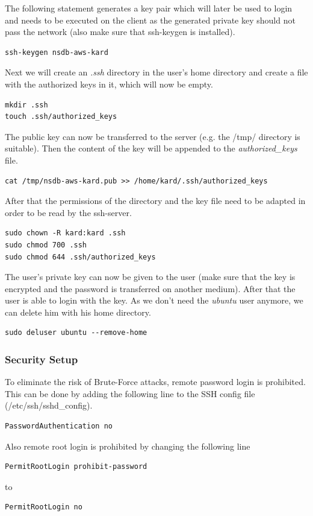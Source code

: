 The following statement generates a key pair which will later be used to login and needs to be executed on the client as the generated private key should not pass the network (also make sure that ssh-keygen is installed).
\begin{lstlisting}
ssh-keygen nsdb-aws-kard
\end{lstlisting}

Next we will create an \textit{.ssh} directory in the user's home directory and create a file with the authorized keys in it, which will now be empty.
\begin{lstlisting}
mkdir .ssh
touch .ssh/authorized_keys
\end{lstlisting}

The public key can now be transferred to the server (e.g. the /tmp/ directory is suitable). Then the content of the key will be appended to the \textit{authorized\_keys} file.
\begin{lstlisting}
cat /tmp/nsdb-aws-kard.pub >> /home/kard/.ssh/authorized_keys
\end{lstlisting}

After that the permissions of the directory and the key file need to be adapted in order to be read by the ssh-server.
\begin{lstlisting}
sudo chown -R kard:kard .ssh
sudo chmod 700 .ssh
sudo chmod 644 .ssh/authorized_keys
\end{lstlisting}

The user's private key can now be given to the user (make sure that the key is encrypted and the password is transferred on another medium). After that the user is able to login with the key. As we don't need the \textit{ubuntu} user anymore, we can delete him with his home directory.
\begin{lstlisting}
sudo deluser ubuntu --remove-home 
\end{lstlisting}

\subsubsection{Security Setup}
To eliminate the risk of Brute-Force attacks, remote password login is prohibited. This can be done by adding the following line to the SSH config file (/etc/ssh/sshd\_config).
\begin{lstlisting}
PasswordAuthentication no
\end{lstlisting}

Also remote root login is prohibited by changing the following line
\begin{lstlisting}
PermitRootLogin prohibit-password
\end{lstlisting}
to
\begin{lstlisting}
PermitRootLogin no
\end{lstlisting}

